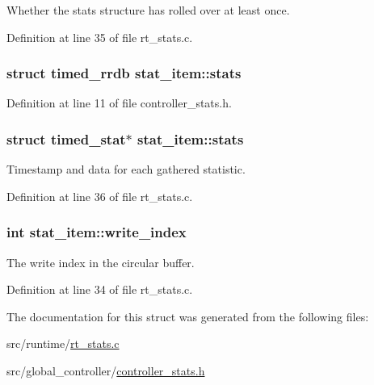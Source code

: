 Whether the stats structure has rolled over at least once. 



Definition at line 35 of file rt\-\_\-stats.\-c.

\hypertarget{structstat__item_ac4feb1e4a0ac9c58669b532bd0c29c45}{
\subsubsection[{stats}]{\setlength{\rightskip}{0pt plus 5cm}struct {\bf timed\-\_\-rrdb} stat\-\_\-item\-::stats}}\label{structstat__item_ac4feb1e4a0ac9c58669b532bd0c29c45}


Definition at line 11 of file controller\-\_\-stats.\-h.

\hypertarget{structstat__item_ad9e139d7db4acd1f95968520023895f5}{
\subsubsection[{stats}]{\setlength{\rightskip}{0pt plus 5cm}struct {\bf timed\-\_\-stat}$\ast$ stat\-\_\-item\-::stats}}\label{structstat__item_ad9e139d7db4acd1f95968520023895f5}


Timestamp and data for each gathered statistic. 



Definition at line 36 of file rt\-\_\-stats.\-c.

\hypertarget{structstat__item_ab965c534375a75af564610e9afe766f4}{
\subsubsection[{write\-\_\-index}]{\setlength{\rightskip}{0pt plus 5cm}int stat\-\_\-item\-::write\-\_\-index}}\label{structstat__item_ab965c534375a75af564610e9afe766f4}


The write index in the circular buffer. 



Definition at line 34 of file rt\-\_\-stats.\-c.



The documentation for this struct was generated from the following files\-:\begin{DoxyCompactItemize}
\item 
src/runtime/\hyperlink{rt__stats_8c}{rt\-\_\-stats.\-c}\item 
src/global\-\_\-controller/\hyperlink{controller__stats_8h}{controller\-\_\-stats.\-h}\end{DoxyCompactItemize}
